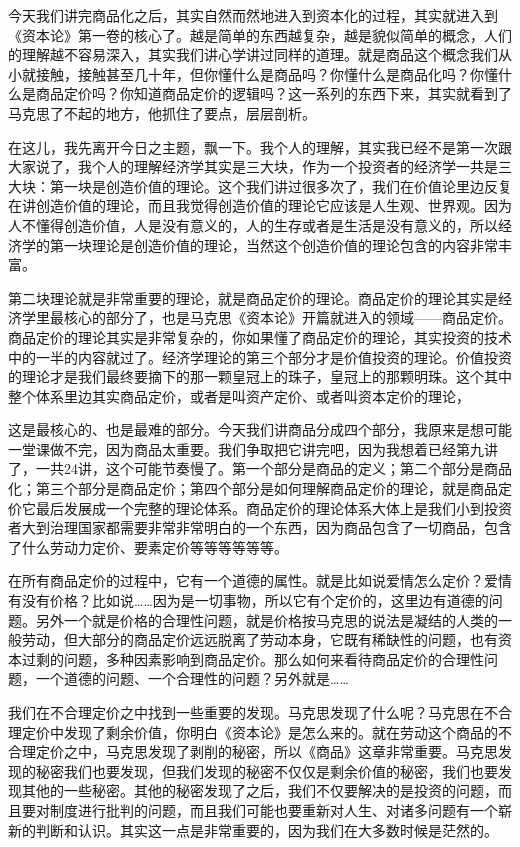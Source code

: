 \documentclass[UTF8, 12pt, a4paper]{ctexrep}
\begin{document}
今天我们讲完商品化之后，其实自然而然地进入到资本化的过程，其实就进入到《资本论》第一卷的核心了。越是简单的东西越复杂，越是貌似简单的概念，人们的理解越不容易深入，其实我们讲心学讲过同样的道理。就是商品这个概念我们从小就接触，接触甚至几十年，但你懂什么是商品吗？你懂什么是商品化吗？你懂什么是商品定价吗？你知道商品定价的逻辑吗？这一系列的东西下来，其实就看到了马克思了不起的地方，他抓住了要点，层层剖析。

在这儿，我先离开今日之主题，飘一下。我个人的理解，其实我已经不是第一次跟大家说了，我个人的理解经济学其实是三大块，作为一个投资者的经济学一共是三大块：第一块是创造价值的理论。这个我们讲过很多次了，我们在价值论里边反复在讲创造价值的理论，而且我觉得创造价值的理论它应该是人生观、世界观。因为人不懂得创造价值，人是没有意义的，人的生存或者是生活是没有意义的，所以经济学的第一块理论是创造价值的理论，当然这个创造价值的理论包含的内容非常丰富。

第二块理论就是非常重要的理论，就是商品定价的理论。商品定价的理论其实是经济学里最核心的部分了，也是马克思《资本论》开篇就进入的领域——商品定价。商品定价的理论其实是非常复杂的，你如果懂了商品定价的理论，其实投资的技术中的一半的内容就过了。经济学理论的第三个部分才是价值投资的理论。价值投资的理论才是我们最终要摘下的那一颗皇冠上的珠子，皇冠上的那颗明珠。这个其中整个体系里边其实商品定价，或者是叫资产定价、或者叫资本定价的理论，

这是最核心的、也是最难的部分。今天我们讲商品分成四个部分，我原来是想可能一堂课做不完，因为商品太重要。我们争取把它讲完吧，因为我想着已经第九讲了，一共24讲，这个可能节奏慢了。第一个部分是商品的定义；第二个部分是商品化；第三个部分是商品定价；第四个部分是如何理解商品定价的理论，就是商品定价它最后发展成一个完整的理论体系。商品定价的理论体系大体上是我们小到投资者大到治理国家都需要非常非常明白的一个东西，因为商品包含了一切商品，包含了什么劳动力定价、要素定价等等等等等等。

在所有商品定价的过程中，它有一个道德的属性。就是比如说爱情怎么定价？爱情有没有价格？比如说……因为是一切事物，所以它有个定价的，这里边有道德的问题。另外一个就是价格的合理性问题，就是价格按马克思的说法是凝结的人类的一般劳动，但大部分的商品定价远远脱离了劳动本身，它既有稀缺性的问题，也有资本过剩的问题，多种因素影响到商品定价。那么如何来看待商品定价的合理性问题，一个道德的问题、一个合理性的问题？另外就是……

我们在不合理定价之中找到一些重要的发现。马克思发现了什么呢？马克思在不合理定价中发现了剩余价值，你明白《资本论》是怎么来的。就在劳动这个商品的不合理定价之中，马克思发现了剥削的秘密，所以《商品》这章非常重要。马克思发现的秘密我们也要发现，但我们发现的秘密不仅仅是剩余价值的秘密，我们也要发现其他的一些秘密。其他的秘密发现了之后，我们不仅要解决的是投资的问题，而且要对制度进行批判的问题，而且我们可能也要重新对人生、对诸多问题有一个崭新的判断和认识。其实这一点是非常重要的，因为我们在大多数时候是茫然的。
\end{document}
